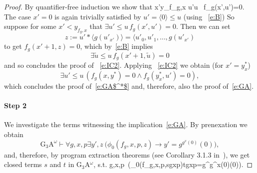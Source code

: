 \begin{proof}
By quantifier-free induction we show that 
\be[e:IC2]\forall x'\leq y_{f_g,x} \exists u'\leq u \, f_g(x',u')=0.\ee
The case $x'=0$ is again trivially satisfied by $u'=\langle 0 \rangle \le u$ 
(using ~\eqref{e:B}) 
So suppose for some $x'< y_{f_g,x}$ that
$\exists u'\leq u \,f_g(x',u')=0$. Then we can set
\[z:=u'*\langle g(u'_{x'})\rangle= \langle u'_0,u'_1,\ldots,g(u'_{x'})\] to get $f_g(x'+1,z)=0$,
which by~\eqref{e:B} implies 
\[\exists \tilde u\leq u \,f_g(x'+1, \tilde u)=0\]
and so concludes the proof of ~\eqref{e:IC2}. Applying ~\eqref{e:IC2} 
we obtain (for $x'=y^*_x$)
\[
\exists u'\leq u\, (f_g(x,y^*)=0\wedge f_g(y^*_x,u')=0),
\]
which concludes the proof of~\eqref{e:GA$^*$} and, therefore, 
also the proof of~\eqref{e:GA}.\\
\paragraph{Step 2} We investigate the terms witnessing the implication~\eqref{e:GA}. By prenexation we obtain
\[
\mbox{G$_3$A}^\omega\vdash \forall g,x,p\exists y',z\ \big(\phi_0(f_g,x,p,z)\rightarrow y'=g^{g^{x}(0)}(0)\big),
\]
and, therefore, by program extraction theorems (see Corollary 3.1.3 in~\cite{Kohlenbach(lowrate)}), we get closed terms $s$ and $t$ in G$_3$A$^\omega$, s.t.
\be[e:st]
\forall g,x,p\ \big(\phi_0(f_g,x,p,sgxp)\rightarrow tgxp=g^{g^{x}(0)}(0)\big).
\ee

\end{proof}
